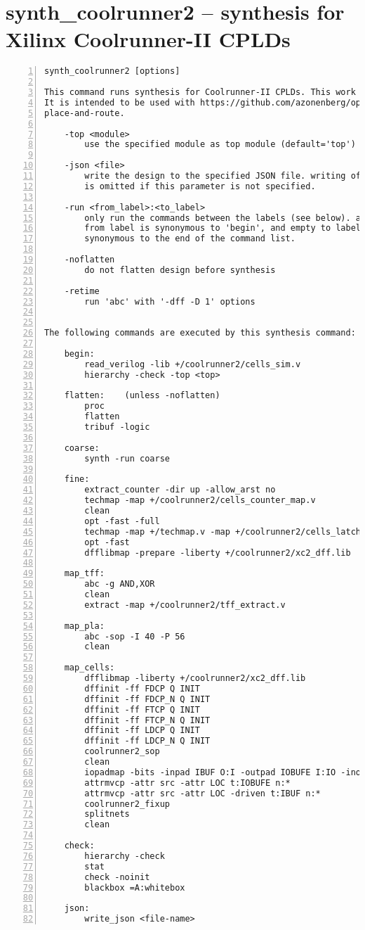 \section{synth\_coolrunner2 -- synthesis for Xilinx Coolrunner-II CPLDs}
\label{cmd:synth_coolrunner2}
\begin{lstlisting}[numbers=left,frame=single]
    synth_coolrunner2 [options]

This command runs synthesis for Coolrunner-II CPLDs. This work is experimental.
It is intended to be used with https://github.com/azonenberg/openfpga as the
place-and-route.

    -top <module>
        use the specified module as top module (default='top')

    -json <file>
        write the design to the specified JSON file. writing of an output file
        is omitted if this parameter is not specified.

    -run <from_label>:<to_label>
        only run the commands between the labels (see below). an empty
        from label is synonymous to 'begin', and empty to label is
        synonymous to the end of the command list.

    -noflatten
        do not flatten design before synthesis

    -retime
        run 'abc' with '-dff -D 1' options


The following commands are executed by this synthesis command:

    begin:
        read_verilog -lib +/coolrunner2/cells_sim.v
        hierarchy -check -top <top>

    flatten:    (unless -noflatten)
        proc
        flatten
        tribuf -logic

    coarse:
        synth -run coarse

    fine:
        extract_counter -dir up -allow_arst no
        techmap -map +/coolrunner2/cells_counter_map.v
        clean
        opt -fast -full
        techmap -map +/techmap.v -map +/coolrunner2/cells_latch.v
        opt -fast
        dfflibmap -prepare -liberty +/coolrunner2/xc2_dff.lib

    map_tff:
        abc -g AND,XOR
        clean
        extract -map +/coolrunner2/tff_extract.v

    map_pla:
        abc -sop -I 40 -P 56
        clean

    map_cells:
        dfflibmap -liberty +/coolrunner2/xc2_dff.lib
        dffinit -ff FDCP Q INIT
        dffinit -ff FDCP_N Q INIT
        dffinit -ff FTCP Q INIT
        dffinit -ff FTCP_N Q INIT
        dffinit -ff LDCP Q INIT
        dffinit -ff LDCP_N Q INIT
        coolrunner2_sop
        clean
        iopadmap -bits -inpad IBUF O:I -outpad IOBUFE I:IO -inoutpad IOBUFE O:IO -toutpad IOBUFE E:I:IO -tinoutpad IOBUFE E:O:I:IO
        attrmvcp -attr src -attr LOC t:IOBUFE n:*
        attrmvcp -attr src -attr LOC -driven t:IBUF n:*
        coolrunner2_fixup
        splitnets
        clean

    check:
        hierarchy -check
        stat
        check -noinit
        blackbox =A:whitebox

    json:
        write_json <file-name>
\end{lstlisting}

